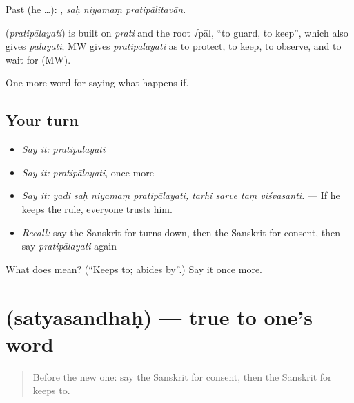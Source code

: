 Past (he …):   , \emph{saḥ niyamaṃ pratipālitavān}.

\begin{cousinweb}
\textbf{} (\emph{pratipālayati}) is built on \emph{prati} and the root √pāl, \textquotedblleft{}to guard, to keep\textquotedblright{}, which also gives \emph{pālayati}; MW gives \emph{pratipālayati} as to protect, to keep, to observe, and to wait for (MW).
\end{cousinweb}

\begin{grammarlens}[title={What you've built}]
One more word for saying what happens if.
\end{grammarlens}

\subsection*{Your turn}
\begin{itemize}
\raggedright
  \item \emph{Say it:} \emph{pratipālayati}
  \item \emph{Say it:} \emph{pratipālayati}, once more
  \item \emph{Say it:} \emph{yadi saḥ niyamaṃ pratipālayati, tarhi sarve taṃ viśvasanti.} — If he keeps the rule, everyone trusts him.
  \item \emph{Recall:} say the Sanskrit for turns down, then the Sanskrit for consent, then say \emph{pratipālayati} again
\end{itemize}

\begin{tcolorbox}[breakable,colback=teal!4,colframe=teal!35!black,title={Before you move on}]
What does  mean? (\textquotedblleft{}Keeps to; abides by\textquotedblright{}.) Say it once more.
\end{tcolorbox}
\section[\texorpdfstring{\sk{सत्यसन्धः} (satyasandhaḥ)}{सत्यसन्धः (satyasandhaḥ)}]{ (satyasandhaḥ) — true to one's word}

\label{lesson:SA-C535-satyasandhah}



\begin{quote}
Before the new one: say the Sanskrit for consent, then the Sanskrit for keeps to.
\end{quote}

